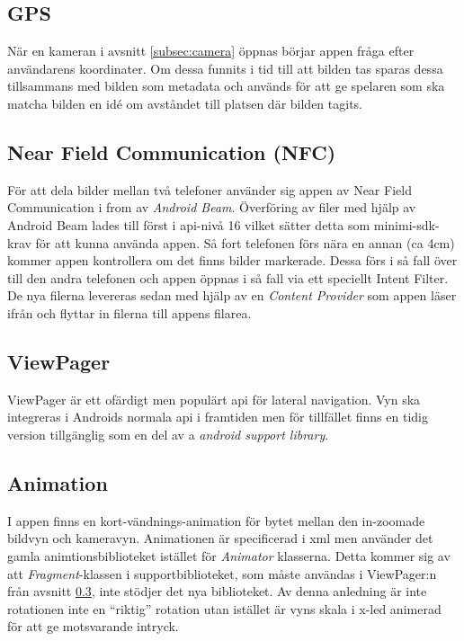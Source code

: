 \documentclass[11px, a4paper]{article}
\begin{document}
\subsection{GPS}
	När en kameran i avsnitt \ref{subsec:camera} öppnas börjar appen fråga efter användarens koordinater. Om dessa funnits i tid till att bilden tas sparas dessa tillsammans med bilden som metadata och används för att ge spelaren som ska matcha bilden en idé om avståndet till platsen där bilden tagits.

\subsection{Near Field Communication (NFC)}
	För att dela bilder mellan två telefoner använder sig appen av Near Field Communication i from av \emph{Android Beam}. Överföring av filer med hjälp av Android Beam lades till först i api-nivå 16 vilket sätter detta som minimi-sdk-krav för att kunna använda appen. Så fort telefonen förs nära en annan (ca 4cm) kommer appen kontrollera om det finns bilder markerade. Dessa förs i så fall över till den andra telefonen och appen öppnas i så fall via ett speciellt Intent Filter. De nya filerna levereras sedan med hjälp av en \emph{Content Provider} som appen läser ifrån och flyttar in filerna till appens filarea.

\subsection{ViewPager}
\label{subsec:viewpager}
	ViewPager är ett ofärdigt\cite{ViewPager} men populärt api för lateral navigation. Vyn ska integreras i Androids normala api i framtiden men för tillfället finns en tidig version tillgänglig som en del av a \emph{android support library}.

\subsection{Animation}
	I appen finns en kort-vändnings-animation för bytet mellan den in-zoomade bildvyn och kameravyn. Animationen är specificerad i xml men använder det gamla animtionsbiblioteket istället för \emph{Animator} klasserna. Detta kommer sig av att \emph{Fragment}-klassen i supportbiblioteket, som måste användas i ViewPager:n från avsnitt \ref{subsec:viewpager}, inte stödjer det nya biblioteket\cite{SupportAnimator}. Av denna anledning är inte rotationen inte en ``riktig'' rotation utan istället är vyns skala i x-led animerad för att ge motsvarande intryck.
\end{document}
